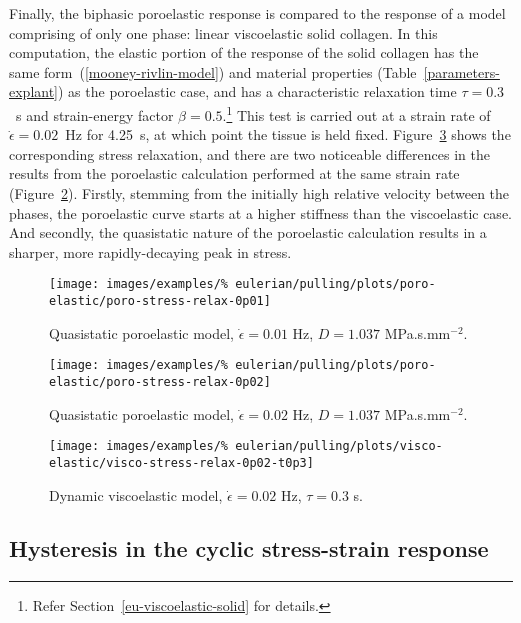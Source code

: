 Finally, the biphasic poroelastic response is compared to the response
of a model comprising of only one phase: linear viscoelastic solid
collagen. In this computation, the elastic portion of the response of
the solid collagen has the same form~(\ref{mooney-rivlin-model}) and
material properties (Table~\ref{parameters-explant}) as the
poroelastic case, and has a characteristic relaxation time
$\tau=0.3$~s and strain-energy factor $\beta=0.5$.\footnote{Refer
  Section~\ref{eu-viscoelastic-solid} for details.} This test is
carried out at a strain rate of $\dot{\epsilon}=0.02$~Hz for 4.25~s,
at which point the tissue is held fixed.
Figure~\ref{visco-stress-relax-0p02-t0p3} shows the corresponding
stress relaxation, and there are two noticeable differences in the
results from the poroelastic calculation performed at the same strain
rate (Figure~\ref{poro-stress-relax-0p02}).  Firstly, stemming from
the initially high relative velocity between the phases, the
poroelastic curve starts at a higher stiffness than the viscoelastic
case. And secondly, the quasistatic nature of the poroelastic
calculation results in a sharper, more rapidly-decaying peak in
stress.

\clearpage

\begin{figure}[!hptb]
  \centering
  \texttt{[image: images/examples/\%
    eulerian/pulling/plots/poro-elastic/poro-stress-relax-0p01]}
  \caption{Quasistatic poroelastic model, $\dot{\epsilon}=0.01$ Hz,
    $D=1.037$ MPa.s.mm$^{-2}$.}
  \label{poro-stress-relax-0p01}
\end{figure}

\begin{figure}[!hptb]
  \centering
  \texttt{[image: images/examples/\%
    eulerian/pulling/plots/poro-elastic/poro-stress-relax-0p02]}
  \caption{Quasistatic poroelastic model, $\dot{\epsilon}=0.02$ Hz,
    $D=1.037$ MPa.s.mm$^{-2}$.}
  \label{poro-stress-relax-0p02}
\end{figure}

\begin{figure}[!hptb]
  \centering
  \texttt{[image: images/examples/\%
    eulerian/pulling/plots/visco-elastic/visco-stress-relax-0p02-t0p3]}
  \caption{Dynamic viscoelastic model, $\dot{\epsilon}=0.02$ Hz,
    $\tau=0.3$ s.}
  \label{visco-stress-relax-0p02-t0p3}
\end{figure}

\subsection{Hysteresis in the cyclic stress-strain response}
\label{hysteresis}

